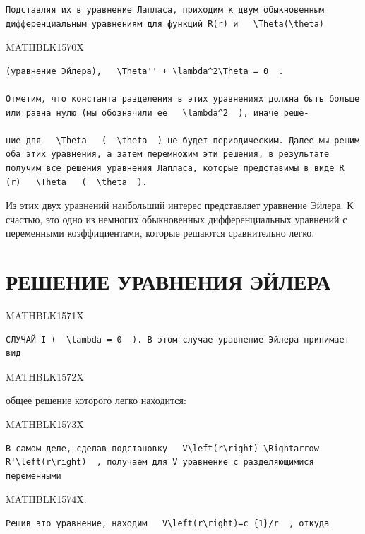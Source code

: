 \documentclass[
]{article}
\begin{document}
\begin{verbatim}
Подставляя их в уравнение Лапласа, приходим к двум обыкновенным дифференциальным уравнениям для функций R(r) и   \Theta(\theta)
\end{verbatim}

MATHBLK1570X

\begin{verbatim}
(уравнение Эйлера),   \Theta'' + \lambda^2\Theta = 0  .

Отметим, что константа разделения в этих уравнениях должна быть больше или равна нулю (мы обозначили ее   \lambda^2  ), иначе реше-

ние для   \Theta   (  \theta  ) не будет периодическим. Далее мы решим оба этих уравнения, а затем перемножим эти решения, в результате получим все решения уравнения Лапласа, которые представимы в виде R (r)   \Theta   (  \theta  ).
\end{verbatim}

Из этих двух уравнений наибольший интерес представляет уравнение Эйлера.
К счастью, это одно из немногих обыкновенных дифференциальных уравнений
с переменными коэффициентами, которые решаются сравнительно легко.

\section{РЕШЕНИЕ УРАВНЕНИЯ
ЭЙЛЕРА}\label{ux440ux435ux448ux435ux43dux438ux435-ux443ux440ux430ux432ux43dux435ux43dux438ux44f-ux44dux439ux43bux435ux440ux430}

MATHBLK1571X

\begin{verbatim}
СЛУЧАЙ I (  \lambda = 0  ). В этом случае уравнение Эйлера принимает вид
\end{verbatim}

MATHBLK1572X

общее решение которого легко находится:

MATHBLK1573X

\begin{verbatim}
В самом деле, сделав подстановку   V\left(r\right) \Rightarrow R'\left(r\right)  , получаем для V уравнение с разделяющимися переменными
\end{verbatim}

MATHBLK1574X.

\begin{verbatim}
Решив это уравнение, находим   V\left(r\right)=c_{1}/r  , откуда
\end{verbatim}
\end{document}
